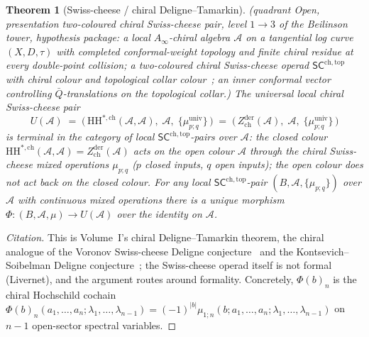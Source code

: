 \documentclass[11pt,reqno]{amsart}
\newtheorem{theorem}{Theorem}[section]
\theoremstyle{definition}
\theoremstyle{remark}
\newcommand{\cA}{\mathcal{A}}
\newcommand{\Ainf}{A_{\infty}}
\newcommand{\SCchtop}{\mathsf{SC}^{\mathrm{ch,top}}}
\newcommand{\HH}{\mathrm{HH}}
\numberwithin{equation}{section}
\begin{document}
\begin{theorem}[Swiss-cheese / chiral Deligne--Tamarkin]
\label{thm:swiss-cheese-chiral-DT-N3}
\textup{(}\emph{quadrant} Open, \emph{presentation} two-coloured
chiral Swiss-cheese pair, \emph{level} $1 \to 3$ of the Beilinson
tower, \emph{hypothesis package}: a local $\Ainf$-chiral algebra
$\cA$ on a tangential log curve $(X, D, \tau)$ with completed
conformal-weight topology and finite chiral residue at every
double-point collision; a two-coloured chiral Swiss-cheese operad
$\SCchtop$ with chiral colour and topological collar
colour~\textup{\cite{Voronov99,KS00}}; an inner conformal vector
controlling $\bar Q$-translations on the topological collar.\textup{)}
The universal local chiral Swiss-cheese pair
\[
  U(\cA) \;=\; \bigl(\,
    \HH^{*,\mathrm{ch}}(\cA, \cA),\; \cA,\;
    \{\mu^{\mathrm{univ}}_{p;q}\}\,\bigr)
  \;=\;
  \bigl(\,Z^{\mathrm{der}}_{\mathrm{ch}}(\cA),\; \cA,\;
  \{\mu^{\mathrm{univ}}_{p;q}\}\,\bigr)
\]
is terminal in the category of local $\SCchtop$-pairs over $\cA$:
the closed colour $\HH^{*,\mathrm{ch}}(\cA, \cA)
= Z^{\mathrm{der}}_{\mathrm{ch}}(\cA)$ acts on the open colour
$\cA$ through the chiral Swiss-cheese mixed operations
$\mu_{p;q}$ \textup{(}$p$ closed inputs, $q$ open inputs\textup{)};
the open colour does not act back on the closed colour. For any
local $\SCchtop$-pair $(B, \cA, \{\mu_{p;q}\})$ over $\cA$ with
continuous mixed operations there is a unique morphism
$\Phi \colon (B, \cA, \mu) \to U(\cA)$ over the identity on $\cA$.
\end{theorem}

\begin{proof}[Citation]
This is Volume~I's chiral Deligne--Tamarkin theorem, the chiral
analogue of the Voronov Swiss-cheese Deligne
conjecture~\cite{Voronov99} and the Kontsevich--Soibelman Deligne
conjecture~\cite{KS00}; the Swiss-cheese operad itself is not
formal (Livernet), and the argument routes around formality. Concretely, $\Phi(b)_n$ is the chiral
Hochschild cochain
$\Phi(b)_n(a_1, \ldots, a_n; \lambda_1, \ldots, \lambda_{n-1})
= (-1)^{|b|}\mu_{1;n}(b; a_1, \ldots, a_n; \lambda_1, \ldots,
\lambda_{n-1})$ on $n - 1$ open-sector spectral variables.
\end{proof}
\end{document}

